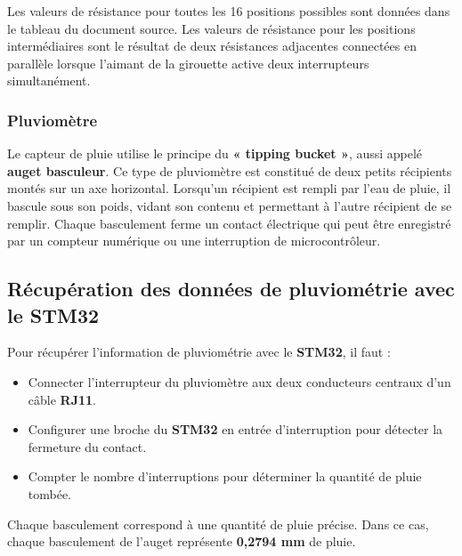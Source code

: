 \documentclass[12pt]{article}
\begin{document}
Les valeurs de résistance pour toutes les 16 positions possibles sont données dans le tableau du document source. Les valeurs de résistance pour les positions intermédiaires sont le résultat de deux résistances adjacentes connectées en parallèle lorsque l'aimant de la girouette active deux interrupteurs simultanément.

\subsubsection{Pluviomètre}
Le capteur de pluie utilise le principe du \textbf{« tipping bucket »}, aussi appelé \textbf{auget basculeur}. Ce type de pluviomètre est constitué de deux petits récipients montés sur un axe horizontal. Lorsqu'un récipient est rempli par l'eau de pluie, il bascule sous son poids, vidant son contenu et permettant à l'autre récipient de se remplir. Chaque basculement ferme un contact électrique qui peut être enregistré par un compteur numérique ou une interruption de microcontrôleur.

\subsection*{Récupération des données de pluviométrie avec le STM32}

Pour récupérer l'information de pluviométrie avec le \textbf{STM32}, il faut :
\begin{itemize}
    \item Connecter l'interrupteur du pluviomètre aux deux conducteurs centraux d'un câble \textbf{RJ11}.
    \item Configurer une broche du \textbf{STM32} en entrée d'interruption pour détecter la fermeture du contact.
    \item Compter le nombre d'interruptions pour déterminer la quantité de pluie tombée.
\end{itemize}

Chaque basculement correspond à une quantité de pluie précise. Dans ce cas, chaque basculement de l'auget représente \textbf{0,2794 mm} de pluie.
\end{document}
